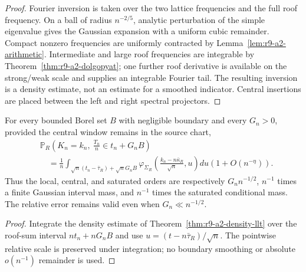 \begin{proof}
Fourier inversion is taken over the two lattice frequencies and the full roof
frequency.  On a ball of radius $n^{-2/5}$, analytic perturbation of the simple
eigenvalue gives the Gaussian expansion with a uniform cubic remainder.
Compact nonzero frequencies are uniformly contracted by
Lemma~\ref{lem:r9-a2-arithmetic}.  Intermediate and large roof frequencies are
integrable by Theorem~\ref{thm:r9-a2-dolgopyat}; one further roof derivative is
available on the strong/weak scale and supplies an integrable Fourier tail.
The resulting inversion is a density estimate, not an estimate for a smoothed
indicator.  Central insertions are placed between the left and right spectral
projectors.
\end{proof}

\begin{corollary}
\label{cor:r9-a2-windows}
For every bounded Borel set $B$ with negligible boundary and every $G_n>0$,
provided the central window remains in the source chart,
\[
 \begin{aligned}
 &\mathbb P_R\left(
 K_n=k_n,\ \frac{T_n}{n}\in t_n+G_nB
 \right)\\
 &\quad=\frac1n
 \int_{\sqrt n(t_n-\bar\tau_R)+\sqrt nG_nB}
 \varphi_{\Sigma_R}\left(
 \frac{k_n-n\bar\kappa_R}{\sqrt n},u
 \right)du
 \left(1+O(n^{-\eta})\right).
 \end{aligned}
\]
Thus the local, central, and saturated orders are respectively
$G_nn^{-1/2}$, $n^{-1}$ times a finite Gaussian interval mass, and $n^{-1}$
times the saturated conditional mass.  The relative error remains valid even
when $G_n\ll n^{-1/2}$.
\end{corollary}

\begin{proof}
Integrate the density estimate of
Theorem~\ref{thm:r9-a2-density-llt} over the roof-sum interval
$nt_n+nG_nB$ and use $u=(t-n\bar\tau_R)/\sqrt n$.  The pointwise relative
scale is preserved under integration; no boundary smoothing or absolute
$o(n^{-1})$ remainder is used.
\end{proof}
